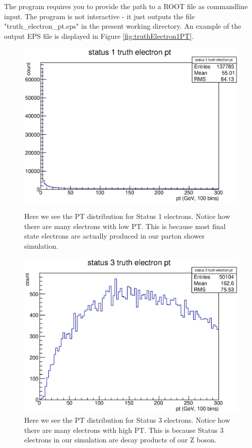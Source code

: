 \documentclass{article}
\begin{document}
The program requires you to provide the path to a ROOT file as commandline input.
The program is not interactive - it just outputs the file "truth\_electron\_pt.eps" in the
present working directory. An example of the output EPS file is displayed in Figure \ref{fig:truthElectron1PT}.

\begin{figure}[!htbp]
\begin{minipage}{0.45\textwidth}
	\centering
	\includegraphics[width = \linewidth]{truth_electron_1_pt.eps}
	\caption{Here we see the PT distribution for Status 1 electrons. Notice how there are many electrons with low PT. This is because most final state electrons are actually produced in our parton shower simulation.}
	\label{fig:truthElectron1PT}
\end{minipage}
\hspace{0.1\textwidth}
\begin{minipage}{0.45\textwidth}
	\centering
	\includegraphics[width = \linewidth]{truth_electron_3_pt.eps}
	\caption{Here we see the PT distribution for Status 3 electrons. Notice how there are many electrons with high PT. This is because Status 3 electrons in our simulation are decay products of our Z boson.}
	\label{fig:truthElectron3PT}
\end{minipage}
\end{figure}
\end{document}

